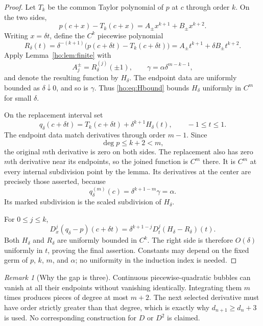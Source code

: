 \documentclass[11pt,reqno]{amsart}
\numberwithin{equation}{section}
\theoremstyle{definition}
\theoremstyle{remark}
\newtheorem{remark}[theorem]{Remark}
\begin{document}
\begin{proof}
Let $T_k$ be the common Taylor polynomial of $p$ at $c$ through order $k$. On the two sides,
\[
 p(c+x)-T_k(c+x)=A_\pm x^{k+1}+B_\pm x^{k+2}.
\]
Writing $x=\delta t$, define the $C^k$ piecewise polynomial
\[
 R_\delta(t)=\delta^{-(k+1)}\bigl(p(c+\delta t)-T_k(c+\delta t)\bigr)
            =A_\pm t^{k+1}+\delta B_\pm t^{k+2}.
\]
Apply Lemma~\ref{ho:lem:finite} with
\[
 A_j^\pm=R_\delta^{(j)}(\pm1),\qquad
 \gamma=\alpha\delta^{m-k-1},
\]
and denote the resulting function by $H_\delta$. The endpoint data are uniformly bounded as $\delta\downarrow0$, and so is $\gamma$. Thus \eqref{ho:eq:Hbound} bounds $H_\delta$ uniformly in $C^m$ for small $\delta$.

On the replacement interval set
\begin{equation}\label{ho:eq:replacement}
 q_\delta(c+\delta t)=T_k(c+\delta t)+\delta^{k+1}H_\delta(t),
 \qquad -1\le t\le1.
\end{equation}
The endpoint data match derivatives through order $m-1$. Since
\begin{equation}\label{ho:eq:gap}
 \deg p\le k+2<m,
\end{equation}
the original $m$th derivative is zero on both sides. The replacement also has zero $m$th derivative near its endpoints, so the joined function is $C^m$ there. It is $C^m$ at every internal subdivision point by the lemma. Its derivatives at the center are precisely those asserted, because
\[
 q_\delta^{(m)}(c)=\delta^{k+1-m}\gamma=\alpha.
\]
Its marked subdivision is the scaled subdivision of $H_\delta$.

For $0\le j\le k$,
\[
 D_x^j(q_\delta-p)(c+\delta t)
 =\delta^{k+1-j}D_t^j(H_\delta-R_\delta)(t).
\]
Both $H_\delta$ and $R_\delta$ are uniformly bounded in $C^k$. The right side is therefore $O(\delta)$ uniformly in $t$, proving the final assertion. Constants may depend on the fixed germ of $p$, $k$, $m$, and $\alpha$; no uniformity in the induction index is needed.
\end{proof}

\begin{remark}[Why the gap is three]
Continuous piecewise-quadratic bubbles can vanish at all their endpoints without vanishing identically. Integrating them $m$ times produces pieces of degree at most $m+2$. The next selected derivative must have order strictly greater than that degree, which is exactly why $d_{n+1}\ge d_n+3$ is used. No corresponding construction for $D$ or $D^2$ is claimed.
\end{remark}
\end{document}
